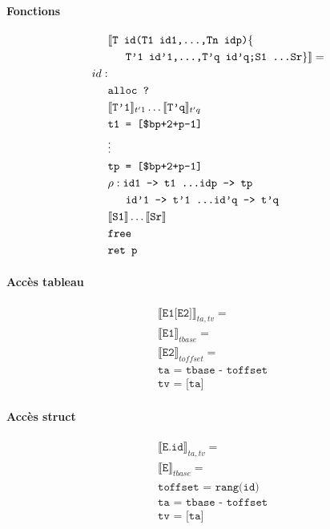 \documentclass[12pt,twocolumn]{report}
\begin{document}
\begin{trad}
    \paragraph*{Fonctions}
    \begin{align*}
        &\llbracket \texttt{T id(T1 id1,\dots,Tn idp)}\lbrace\\
        &\hphantom{aa} \texttt{ T'1 id'1,\dots,T'q id'q;S1 \dots Sr}\rbrace \rrbracket= \\
        id:&\\
        &\texttt{alloc ?} \\
        &\llbracket \texttt{T'1} \rrbracket_{t'1} \dots\llbracket \texttt{T'q} \rrbracket_{t'q} \\
        &\texttt{t1 = [\$bp+2+p-1]}\\
        &\vdots\\
        &\texttt{tp = [\$bp+2+p-1]}\\
        &\rho: \texttt{id1 --> t1 \dots idp --> tp}\\
        &\hphantom{aaa}\texttt{id'1 --> t'1 \dots id'q --> t'q}\\
        &\llbracket \texttt{S1} \rrbracket \dots\llbracket \texttt{Sr} \rrbracket\\
        &\texttt{free}\\
        &\texttt{ret p}
    \end{align*}
\end{trad}
\begin{trad}
    \paragraph*{Accès tableau}
    \begin{align*}
        &\llbracket \texttt{E1[E2]} \rrbracket_{ta,tv}= \\
        &\llbracket \texttt{E1} \rrbracket_{tbase}= \\
        &\llbracket \texttt{E2} \rrbracket_{toffset}= \\
        &\texttt{ta = tbase - toffset}\\
        &\texttt{tv = [ta]} 
    \end{align*}
\end{trad}
\begin{trad}
    \paragraph*{Accès struct}
    \begin{align*}
        &\llbracket \texttt{E.id} \rrbracket_{ta,tv}= \\
        &\llbracket \texttt{E} \rrbracket_{tbase}= \\
        &\texttt{toffset = rang(id)}\\
        &\texttt{ta = tbase - toffset}\\
        &\texttt{tv = [ta]} 
    \end{align*}
\end{trad}
\end{document}
